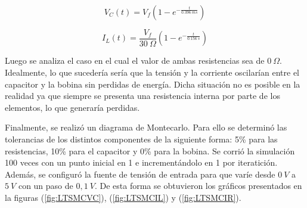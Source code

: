 \documentclass[a4paper]{article}
\begin{document}
\begin{equation}
	V_{C} (t) = V_{f} \left( 1 - e^{- \frac{t}{0.396 \ ms}  } \right)
	\label{eq:carg-c}
\end{equation}

\begin{equation}
	I_{L} (t) = \frac{V_{f}}{30 \ \Omega} \left( 1 - e^{- \frac{t}{0.156 \ s}  } \right)
	\label{eq:carg-l}
\end{equation}

%
%
%

Luego se analiza el caso en el cual el valor de ambas resistencias sea de $0 \ \Omega$. Idealmente, lo que sucedería sería que la tensión y la corriente oscilarían entre el capacitor y la bobina sin perdidas de energía. Dicha situación no es posible en la realidad ya que siempre se presenta una resistencia interna por parte de los elementos, lo que generaría perdidas. 

Finalmente, se realizó un diagrama de Montecarlo. Para ello se determinó las tolerancias de los distintos componentes de la siguiente forma: 5\% para las resistencias, 10\% para el capacitor y 0\% para la bobina. Se corrió la simulación 100 veces con un punto inicial en 1 e incrementándolo en 1 por iteratición. Además, se configuró la fuente de tensión de entrada para que varíe desde $0 \ V$ a $5 \ V$ con un paso de $0,1 \ V$. De esta forma se obtuvieron los gráficos presentados en la figuras (\ref{fig:LTSMCVC}), (\ref{fig:LTSMCIL}) y (\ref{fig:LTSMCIR}).
\end{document}
